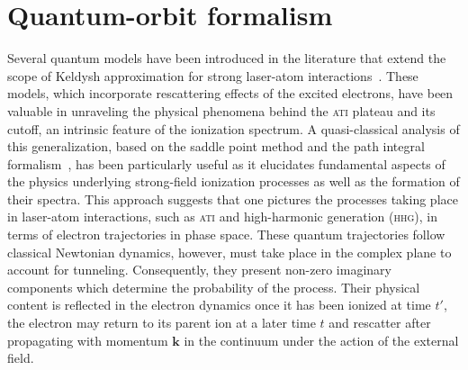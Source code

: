 

\section{\label{sec:q_paths} Quantum-orbit formalism}

Several quantum models have been introduced in the literature that
extend the scope of Keldysh approximation for strong laser-atom
interactions~\cite{LewensteinSPA_1994,Lewenstein_1995,Kopold_1997sfa}. These
models, which incorporate rescattering effects of the excited
electrons, have been valuable in unraveling the physical phenomena
behind the \textsc{ati} plateau and its cutoff, an intrinsic feature
of the ionization spectrum. A quasi-classical analysis of this
generalization, based on the saddle point method and the path integral
formalism~\cite{KopoldOptComm2000,Becker_ellipticalSPA,LewScience2001},
has been particularly useful as it elucidates fundamental aspects of
the physics underlying strong-field ionization processes as well as
the formation of their spectra. This approach suggests that one
pictures the processes taking place in laser-atom interactions, such
as \textsc{ati} and high-harmonic generation (\textsc{hhg}), in terms
of electron trajectories in phase space. These quantum trajectories
follow classical Newtonian dynamics, however, must take place in the
complex plane to account for tunneling. Consequently, they present
non-zero imaginary components which determine the probability of the
process. Their physical content is reflected in the electron dynamics
once it has been ionized at time $t'$, the electron may return to its
parent ion at a later time $t$ and rescatter after propagating with
momentum $\mathbf{k}$ in the continuum under the action of the
external field.

